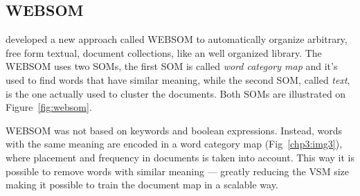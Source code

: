 

\subsection{WEBSOM}
\label{sub:websom}
\citet{honkelawebsom} developed a new approach called WEBSOM to automatically organize arbitrary, free form textual, document collections, like an well organized library. The WEBSOM uses two SOMs, the first \ac{SOM} is called \textit{word category map } and it's used to find words that have similar meaning, while the second \ac{SOM}, called \textit{text}, is the one actually used to cluster the documents. Both SOMs are illustrated on Figure~\ref{fig:websom}.  

WEBSOM was not based on keywords and boolean expressions. Instead, words with the same meaning are encoded in a word category map (Fig~\ref{chp3:img3}), where placement and frequency in documents is taken into account. This way it is possible to remove words with similar meaning --- greatly reducing the \ac{VSM} size  making it possible to train the document map in a scalable way.
                                                                                                          
